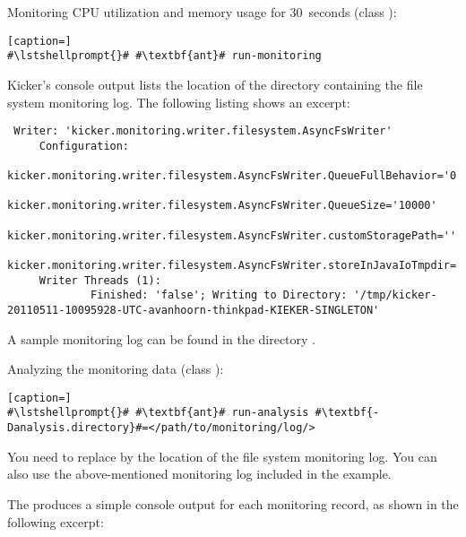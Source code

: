 \begin{compactenum}
\item Monitoring CPU utilization and memory usage for 30~seconds (class ):
\setBashListing
\begin{lstlisting}[caption=]
#\lstshellprompt{}# #\textbf{ant}# run-monitoring
\end{lstlisting}

Kicker's console output lists the location of the directory containing the file system %
monitoring log. The following listing shows an excerpt: %

\pagebreak
\setBashListing
\begin{lstlisting}
 Writer: 'kicker.monitoring.writer.filesystem.AsyncFsWriter'
     Configuration:
             kicker.monitoring.writer.filesystem.AsyncFsWriter.QueueFullBehavior='0'
             kicker.monitoring.writer.filesystem.AsyncFsWriter.QueueSize='10000'
             kicker.monitoring.writer.filesystem.AsyncFsWriter.customStoragePath=''
             kicker.monitoring.writer.filesystem.AsyncFsWriter.storeInJavaIoTmpdir='true'
     Writer Threads (1): 
             Finished: 'false'; Writing to Directory: '/tmp/kicker-20110511-10095928-UTC-avanhoorn-thinkpad-KIEKER-SINGLETON'
\end{lstlisting}

A sample monitoring log can be found in the directory .

\item Analyzing the monitoring data (class ):

\setBashListing
\begin{lstlisting}[caption=]
#\lstshellprompt{}# #\textbf{ant}# run-analysis #\textbf{-Danalysis.directory}#=</path/to/monitoring/log/>
\end{lstlisting}

You need to replace  by the location of the file system monitoring log. %
You can also use the above-mentioned monitoring log included in the example. %

The  produces a simple console output for each monitoring record, %
as shown in the following excerpt: 


\end{compactenum}
